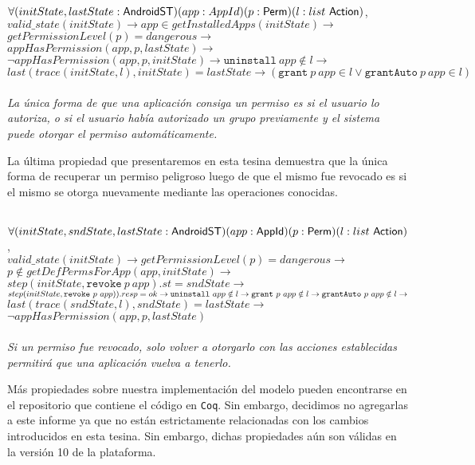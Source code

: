 \begin{prop}
    \label{impproperty2}
    \mbox{} \\
    $	\forall (initState,lastState:\mathsf{AndroidST}) (app:AppId) (p:\mathsf{Perm}) (l: list\ \mathsf{Action})$, \\
    $	valid\_state(initState) \rightarrow app \in getInstalledApps(initState) \rightarrow$ \\
    $	getPermissionLevel(p)= dangerous \rightarrow $\\
    $	appHasPermission(app,p,lastState) \rightarrow$\\
    $	\neg appHasPermission(app,p,initState)\rightarrow \texttt{uninstall}~app \notin l \rightarrow
    $ \\
    $	last(trace(initState,l),initState) = lastState \rightarrow (\texttt{grant}~p~app \in l \lor
        \texttt{grantAuto}~p~app \in l)$ \\ \\
    \textit{La única forma de que una aplicación consiga un permiso es si el usuario lo autoriza, o
        si el usuario había autorizado un grupo previamente y el sistema puede otorgar el permiso
        automáticamente.}
\end{prop}

La última propiedad que presentaremos en esta tesina demuestra que la única forma de recuperar un
permiso peligroso luego de que el mismo fue revocado es si el mismo se otorga nuevamente mediante
las operaciones conocidas.

\begin{prop}
    \mbox{} \\
    $	\forall (initState,sndState,lastState:\mathsf{AndroidST}) (app:\mathsf{AppId}) (p:\mathsf{Perm}) (l:
        list~\mathsf{Action})$, \\
    $	valid\_state(initState) \rightarrow getPermissionLevel(p) = dangerous \rightarrow$ \\
    $   p \notin getDefPermsForApp(app,initState) \rightarrow$ \\
    $	step(initState,\texttt{revoke}~p~app).st = sndState \rightarrow$ \\
    $	step(initState, \texttt{revoke}~p~app)).resp=ok \rightarrow \\
        \texttt{uninstall}~app \notin l \rightarrow \texttt{grant}~p~app \notin l \rightarrow
        \texttt{grantAuto}~p~app \notin l \rightarrow $\\
    $	last(trace(sndState,l),sndState) = lastState \rightarrow$\\
    $	\neg appHasPermission(app,p,lastState)$ \\ \\
    \textit{Si un permiso fue revocado, solo volver a otorgarlo con las acciones establecidas
        permitirá que una aplicación vuelva a tenerlo.}
\end{prop}

Más propiedades sobre nuestra implementación del modelo pueden encontrarse en el repositorio que
contiene el código en \texttt{Coq}\cite{github-code}. Sin embargo, decidimos no agregarlas a este
informe ya que no están estrictamente relacionadas con los cambios introducidos en esta tesina. Sin
embargo, dichas propiedades aún son válidas en la versión 10 de la plataforma.